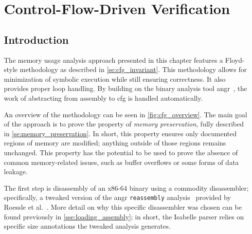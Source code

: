 \chapter{Control-Flow-Driven Verification}\label{ch:cfg}

\section{Introduction}\label{se:cfg_intro}
The memory usage analysis approach presented in this chapter
features a Floyd-style methodology as described in \cref{se:cfg_invariant}.
This methodology allows for minimization of symbolic execution
 while still ensuring correctness.
It also provides proper loop handling.
By building on the binary analysis tool angr~\citep{shoshitaishvili2016state},
the work of abstracting from assembly to \ac{cfg} is handled automatically.

An overview of the methodology can be seen in \cref{fig:cfg_overview}.
The main goal of the approach is to prove the property of \emph{memory preservation},
fully described in \cref{se:memory_preservation}.
In short, this property ensures only documented regions of memory are modified;
anything outside of those regions remains unchanged.
This property has the potential to be used
to prove the absence of common memory-related issues,
such as buffer overflows or some forms of data leakage.

The first step is disassembly of an x86-64 binary using a commodity disassembler;
specifically, a tweaked version of the angr
\lstinline|reassembly| analysis~\citep{wang2017ramblr}
provided by Roessle et al.~\citep{roessle2019}.
More detail on why this specific disassembler was chosen
can be found previously in \cref{sse:loading_assembly}; in short,
the Isabelle parser relies on specific size annotations the tweaked analysis generates.

